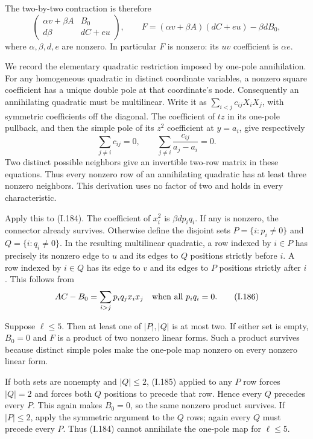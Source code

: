 The two-by-two contraction is therefore
\[
 \begin{pmatrix}
  \alpha v+\beta A&B_0\\
  d\beta&dC+e u
 \end{pmatrix},
 \qquad
 F=(\alpha v+\beta A)(dC+e u)-\beta dB_0,
 \tag{I.184}
\]
where $\alpha,\beta,d,e$ are nonzero. In particular $F$ is
nonzero: its $uv$ coefficient is $\alpha e$.

We record the elementary quadratic restriction imposed by
one-pole annihilation. For any homogeneous quadratic in
distinct coordinate variables, a nonzero square coefficient
has a unique double pole at that coordinate's node.
Consequently an annihilating quadratic must be multilinear.
Write it as $\sum_{i<j}c_{ij}X_iX_j$, with symmetric
coefficients off the diagonal. The coefficient of $tz$ in
its one-pole pullback, and then the simple pole of its $z^2$
coefficient at $y=a_i$, give respectively
\[
 \sum_{j\ne i}c_{ij}=0,
 \qquad
 \sum_{j\ne i}\frac{c_{ij}}{a_j-a_i}=0.
 \tag{I.185}
\]
Two distinct possible neighbors give an invertible two-row
matrix in these equations. Thus every nonzero row of an
annihilating quadratic has at least three nonzero neighbors.
This derivation uses no factor of two and holds in every
characteristic.

Apply this to (I.184). The coefficient of $x_i^2$ is
$\beta d p_iq_i$. If any is nonzero, the connector already
survives. Otherwise define the disjoint sets
$P=\{i:p_i\ne0\}$ and $Q=\{i:q_i\ne0\}$.
In the resulting multilinear quadratic, a row indexed by
$i\in P$ has precisely its nonzero edge to $u$ and its
edges to $Q$ positions strictly before $i$. A row indexed
by $i\in Q$ has its edge to $v$ and its edges to $P$
positions strictly after $i$. This follows from
\[
 AC-B_0=\sum_{i>j}p_iq_jx_ix_j
 \quad\hbox{when all }p_iq_i=0.
 \tag{I.186}
\]

Suppose $\ell\le5$. Then at least one of $|P|,|Q|$ is
at most two. If either set is empty, $B_0=0$ and $F$ is
a product of two nonzero linear forms. Such a product
survives because distinct simple poles make the one-pole
map nonzero on every nonzero linear form.

If both sets are nonempty and $|Q|\le2$, (I.185) applied
to any $P$ row forces $|Q|=2$ and forces both $Q$ positions
to precede that row. Hence every $Q$ precedes every $P$.
This again makes $B_0=0$, so the same nonzero product
survives. If $|P|\le2$, apply the symmetric argument to
the $Q$ rows; again every $Q$ must precede every $P$.
Thus (I.184) cannot annihilate the one-pole map for
$\ell\le5$.

